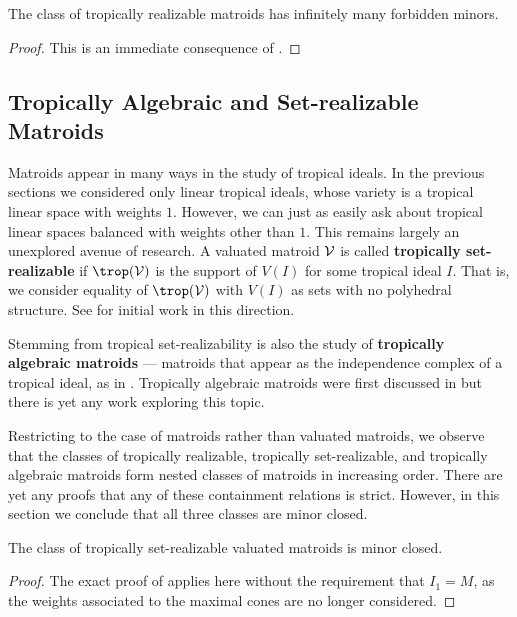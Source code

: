 \begin{corollary}
    The class of tropically realizable matroids has infinitely many forbidden minors.
\end{corollary}
\begin{proof}
    This is an immediate consequence of .
\end{proof}



\subsection{Tropically Algebraic and Set-realizable Matroids}\label{subsec:A&StRealizable}

    Matroids appear in many ways in the study of tropical ideals. In the previous sections we considered only linear tropical ideals, whose variety is a tropical linear space with weights $1$. However, we can just as easily ask about tropical linear spaces balanced with weights other than $1$. This remains largely an unexplored avenue of research. A valuated matroid $\mathcal{V}$ is called \textbf{tropically set-realizable} if $\trop(\sV)$ is the support of $V(I)$ for some tropical ideal $I$. That is, we consider equality of $\trop(\sV)$ with $V(I)$ as sets with no polyhedral structure. See \cite{Yu17} for initial work in this direction. 
    
    Stemming from tropical set-realizability is also the study of \textbf{tropically algebraic matroids} --- matroids that appear as the independence complex of a tropical ideal, as in . Tropically algebraic matroids were first discussed in \cite{DR19} but there is yet any work exploring this topic.
    
    Restricting to the case of matroids rather than valuated matroids, we observe that the classes of tropically realizable, tropically set-realizable, and tropically algebraic matroids form nested classes of matroids in increasing order. There are yet any proofs that any of these containment relations is strict. However, in this section we conclude that all three classes are minor closed.

\begin{proposition}
The class of tropically set-realizable valuated matroids is minor closed.
\end{proposition}
\begin{proof}
The exact proof of  applies here without the requirement that $I_1=M$, as the weights associated to the maximal cones are no longer considered.
\end{proof}


